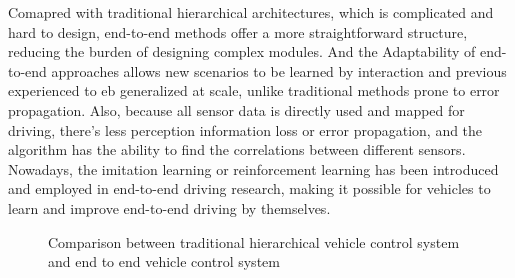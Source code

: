 Comapred with traditional hierarchical architectures, which is complicated and hard to design, end-to-end methods offer a more straightforward structure, reducing the burden of designing complex modules. And the Adaptability of end-to-end approaches allows new scenarios to be learned by interaction and previous experienced to eb generalized at scale, unlike traditional methods prone to error propagation. Also, because all sensor data is directly used and mapped for driving, there's less perception information loss or error propagation, and the algorithm has the ability to find the correlations between different sensors. Nowadays, the imitation learning or reinforcement learning has been introduced and employed in end-to-end driving research, making it possible for vehicles to learn and improve end-to-end driving by themselves.

\begin{figure}[h]
\centering
{}
\caption{Comparison between traditional hierarchical vehicle control system and end to end vehicle control system}
\label{fig: traditional endToEnd}
\end{figure}


